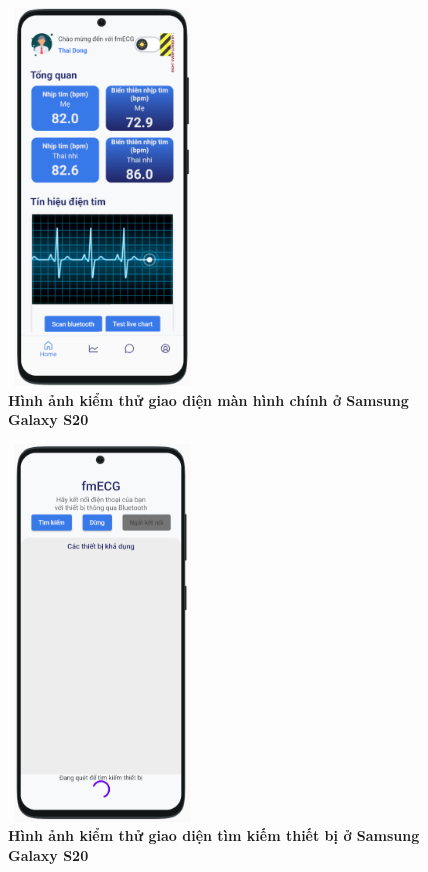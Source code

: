 \begin{figure}[H]
  \centering
  \includegraphics[width=5cm,height=10cm]{Images/mobile_app/demo/android_device_preview_home_screen.png}
  \caption[Hình ảnh kiểm thử giao diện màn hình chính ở Samsung Galaxy S20]{\bfseries \fontsize{12pt}{0pt}
  \selectfont Hình ảnh kiểm thử giao diện màn hình chính ở Samsung Galaxy S20}
  \label{android_device_preview_home_screen}
\end{figure}

\begin{figure}[H]
  \centering
  \includegraphics[width=5cm,height=10cm]{Images/mobile_app/demo/android_device_preview_find_device.png}
  \caption[Hình ảnh kiểm thử giao diện tìm kiếm thiết bị ở Samsung Galaxy S20]{\bfseries \fontsize{12pt}{0pt}
  \selectfont Hình ảnh kiểm thử giao diện tìm kiếm thiết bị ở Samsung Galaxy S20}
  \label{android_device_preview_find_device}
\end{figure}

